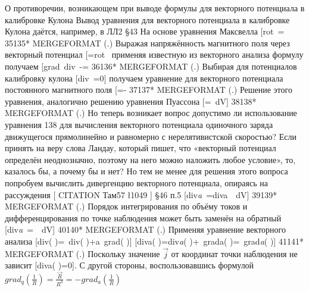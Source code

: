 \documentclass[11pt]{article}
\begin{document}
О противоречии, возникающем при выводе формулы для векторного потенциала
в калибровке Кулона Вывод уравнения для векторного потенциала в
калибровке Кулона даётся, например, в ЛЛ2 §43 На основе уравнения
Максвелла {[}rot~=\overrightarrow{j}{]}
35135* MERGEFORMAT (.) Выражая напряжённость магнитного поля через
векторный потенциал
{[}=rot~\overrightarrow{{{A}_{H}}}{]} применяя
известную из векторного анализа формулу получаем
{[}grad~div~-\Delta {}=\overrightarrow{j}{]}
36136* MERGEFORMAT (.) Выбирая для потенциалов калибровку кулона
{[}div~=0{]} получаем уравнение для векторного
потенциала постоянного магнитного поля
{[}\Delta {}=-\overrightarrow{j}{]}
37137* MERGEFORMAT (.) Решение этого уравнения, аналогично решению
уравнения Пуассона
{[}=~dV{]}
38138* MERGEFORMAT (.) Но теперь возникает вопрос допустимо ли
использование уравнения 138 для вычисления векторного потенциала
одиночного заряда движущегося прямолинейно и равномерно с
нерелятивистской скоростью? Если принять на веру слова Ландау, который
пишет, что «векторный потенциал определён неоднозначно, поэтому на него
можно наложить любое условие», то, казалось бы, а почему бы и нет? Но
тем не менее для решения этого вопроса попробуем вычислить дивергенцию
векторного потенциала, опираясь на рассуждения {[} CITATION Там57
\l 1049 {]} §46 п.5
{[}di{{v}\emph{{a}}~=di{{v}}{a}}~~dV{]}
39139* MERGEFORMAT (.) Порядок интегрирования по объёму токов и
дифференцирования по точке наблюдения может быть заменён на обратный
{[}di{{v}\emph{{a}}~=~~dV{]}
40140* MERGEFORMAT (.) Применяя уравнение векторного анализа
{[}div\left( \varphi {} \right)=\varphi ~div\left(
 \right)+a~grad\left( \varphi  \right){]}
{[}di{{v}}{a}}\left( 
\right)=di{{v}\emph{{a}}\left( 
\right)+~gra{{d}}{a}}\left( 
\right)=~gra{{d}\emph{{a}}\left( 
\right){]} 41141* MERGEFORMAT (.) Поскольку значение
\(\overrightarrow{j}\) от координат точки наблюдения не зависит
{[}di{{v}}{a}}\left(  \right)=0{]}. С другой
стороны, воспользовавшись формулой
\(gra{{d}_{q}}\left( \frac{1}{R} \right)=\frac{\overrightarrow{R}}{{{R}^{3}}}=-gra{{d}_{a}}\left( \frac{1}{R} \right)\)
\end{document}
